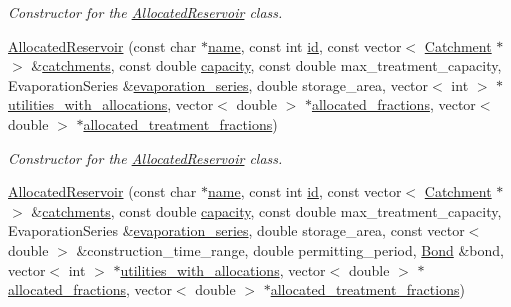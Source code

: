 \begin{DoxyCompactItemize}
\begin{DoxyCompactList}\small\item\em Constructor for the \mbox{\hyperlink{classAllocatedReservoir}{Allocated\+Reservoir}} class. \end{DoxyCompactList}\item 
\mbox{\hyperlink{classAllocatedReservoir_a17a60d40d936b1a68459d0bd9578aada}{Allocated\+Reservoir}} (const char $\ast$\mbox{\hyperlink{classWaterSource_a846ea74c5b453d014f594d41fee8c765}{name}}, const int \mbox{\hyperlink{classWaterSource_a6eafe5dfefd317877d1244e8a7c6e742}{id}}, const vector$<$ \mbox{\hyperlink{classCatchment}{Catchment}} $\ast$$>$ \&\mbox{\hyperlink{classWaterSource_a8c18c34f23f8a06685c1d12f462ed830}{catchments}}, const double \mbox{\hyperlink{classWaterSource_a2ec257b415b248214a8bce7fc5267723}{capacity}}, const double max\+\_\+treatment\+\_\+capacity, Evaporation\+Series \&\mbox{\hyperlink{classReservoir_a2d2d9b302c13703309bb798d24136810}{evaporation\+\_\+series}}, double storage\+\_\+area, vector$<$ int $>$ $\ast$\mbox{\hyperlink{classWaterSource_ac345583fc2d0f7e1db31ee40244d7ace}{utilities\+\_\+with\+\_\+allocations}}, vector$<$ double $>$ $\ast$\mbox{\hyperlink{classWaterSource_a2f6655a80c4847fe039987255d9d998c}{allocated\+\_\+fractions}}, vector$<$ double $>$ $\ast$\mbox{\hyperlink{classWaterSource_aa73fe10cfc6579b2fb79529e1dde5140}{allocated\+\_\+treatment\+\_\+fractions}})
\begin{DoxyCompactList}\small\item\em Constructor for the \mbox{\hyperlink{classAllocatedReservoir}{Allocated\+Reservoir}} class. \end{DoxyCompactList}\item 
\mbox{\hyperlink{classAllocatedReservoir_a44ac982717a21a0b24bb3019d07ffe89}{Allocated\+Reservoir}} (const char $\ast$\mbox{\hyperlink{classWaterSource_a846ea74c5b453d014f594d41fee8c765}{name}}, const int \mbox{\hyperlink{classWaterSource_a6eafe5dfefd317877d1244e8a7c6e742}{id}}, const vector$<$ \mbox{\hyperlink{classCatchment}{Catchment}} $\ast$$>$ \&\mbox{\hyperlink{classWaterSource_a8c18c34f23f8a06685c1d12f462ed830}{catchments}}, const double \mbox{\hyperlink{classWaterSource_a2ec257b415b248214a8bce7fc5267723}{capacity}}, const double max\+\_\+treatment\+\_\+capacity, Evaporation\+Series \&\mbox{\hyperlink{classReservoir_a2d2d9b302c13703309bb798d24136810}{evaporation\+\_\+series}}, double storage\+\_\+area, const vector$<$ double $>$ \&construction\+\_\+time\+\_\+range, double permitting\+\_\+period, \mbox{\hyperlink{classBond}{Bond}} \&bond, vector$<$ int $>$ $\ast$\mbox{\hyperlink{classWaterSource_ac345583fc2d0f7e1db31ee40244d7ace}{utilities\+\_\+with\+\_\+allocations}}, vector$<$ double $>$ $\ast$\mbox{\hyperlink{classWaterSource_a2f6655a80c4847fe039987255d9d998c}{allocated\+\_\+fractions}}, vector$<$ double $>$ $\ast$\mbox{\hyperlink{classWaterSource_aa73fe10cfc6579b2fb79529e1dde5140}{allocated\+\_\+treatment\+\_\+fractions}})

\end{DoxyCompactItemize}
